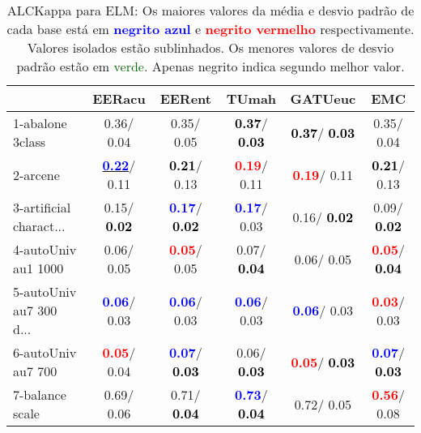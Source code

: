 \begin{table}[h]
\caption{ALCKappa para ELM: Os maiores valores da média e desvio padrão de cada base está em \textcolor{blue}{\textbf{negrito azul}} e \textcolor{red}{\textbf{negrito vermelho}} respectivamente. Valores isolados estão sublinhados. Os menores valores de desvio padrão estão em \textcolor{darkgreen}{verde}. Apenas negrito indica segundo melhor valor.}
\begin{center}\begin{tabular}{lc|c|c|c|c}
 & EERacu & EERent & TUmah & \textbf{GATUeuc} & EMC\\ \hline 1-abalone 3class &   0.36/  0.04 &   0.35/  0.05 & \textcolor{black}{\textbf{  0.37}}/\textcolor{black}{\textbf{  0.03}} & \textcolor{black}{\textbf{  0.37}}/\textcolor{black}{\textbf{  0.03}} &   0.35/  0.04 \\
2-arcene & \underline{\textcolor{blue}{\textbf{  0.22}}}/  0.11 & \textcolor{black}{\textbf{  0.21}}/  0.13 & \textcolor{red}{\textbf{  0.19}}/  0.11 & \textcolor{red}{\textbf{  0.19}}/  0.11 & \textcolor{black}{\textbf{  0.21}}/  0.13 \\
3-artificial charact... &   0.15/\textcolor{black}{\textbf{  0.02}} & \textcolor{blue}{\textbf{  0.17}}/\textcolor{black}{\textbf{  0.02}} & \textcolor{blue}{\textbf{  0.17}}/  0.03 &   0.16/\textcolor{black}{\textbf{  0.02}} &   0.09/\textcolor{black}{\textbf{  0.02}} \\
4-autoUniv au1 1000 &   0.06/  0.05 & \textcolor{red}{\textbf{  0.05}}/  0.05 &   0.07/\textcolor{black}{\textbf{  0.04}} &   0.06/  0.05 & \textcolor{red}{\textbf{  0.05}}/\textcolor{black}{\textbf{  0.04}} \\
5-autoUniv au7 300 d... & \textcolor{blue}{\textbf{  0.06}}/  0.03 & \textcolor{blue}{\textbf{  0.06}}/  0.03 & \textcolor{blue}{\textbf{  0.06}}/  0.03 & \textcolor{blue}{\textbf{  0.06}}/  0.03 & \textcolor{red}{\textbf{  0.03}}/  0.03 \\
6-autoUniv au7 700 & \textcolor{red}{\textbf{  0.05}}/  0.04 & \textcolor{blue}{\textbf{  0.07}}/\textcolor{black}{\textbf{  0.03}} &   0.06/\textcolor{black}{\textbf{  0.03}} & \textcolor{red}{\textbf{  0.05}}/\textcolor{black}{\textbf{  0.03}} & \textcolor{blue}{\textbf{  0.07}}/\textcolor{black}{\textbf{  0.03}} \\
7-balance scale &   0.69/  0.06 &   0.71/\textcolor{black}{\textbf{  0.04}} & \textcolor{blue}{\textbf{  0.73}}/\textcolor{black}{\textbf{  0.04}} &   0.72/  0.05 & \textcolor{red}{\textbf{  0.56}}/  0.08 \\ \hline

\end{tabular}
\end{center}
\end{table}
